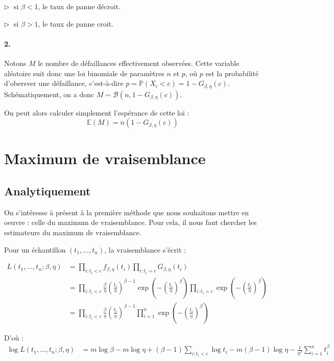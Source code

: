 \documentclass[a4paper]{report}
\begin{document}
 $\triangleright \; $ si $\beta<1$, le taux de panne décroit.
 
  $\triangleright \; $ si $\beta>1$, le taux de panne croit.
  
  \subsubsection{2.}
  Notons $M$ le nombre de défaillances effectivement observées. Cette variable aléatoire suit donc une loi binomiale de paramètres $n$ et $p$, où $p$ est la probabilité d'obersver une défaillance, c'est-à-dire $p=\mathbb{P}(X_i<c)=1-G_{\beta,\eta}(c)$. Schématiquement, on a donc $M \sim \mathcal{B}(n,1-G_{\beta,\eta}(c))$.
  
  On peut alors calculer simplement l'espérance de cette loi :
  \[\mathbb{E}(M)=n(1-G_{\beta,\eta}(c))\]
  
  
  \chapter {Maximum de vraisemblance}
  
    \section{Analytiquement \label{sec:calculEMV}}
    
    On s'intéresse à présent à la première méthode que nous souhaitons mettre en oeuvre : celle du maximum de vraisemblance. Pour cela, il nous faut chercher les estimateurs du maximum de vraisemblance.
    
    Pour un échantillon $(t_1,...,t_n)$, la vraisemblance s'écrit :
    
    \begin{align*}
	L(t_1,...,t_n;\beta,\eta) & = \prod_{i:t_i<c} {f_{\beta,\eta}(t_i)}  \prod_{i:t_i=c} {G_{\beta,\eta}(t_i)} \\
	& =  \prod_{i:t_i<c}{\frac{\beta}{\eta} \left(\frac{t_i}{\eta}\right)^{\beta-1}\exp\left(-\left(\frac{t_i}{\eta}\right)^{\beta}\right) }  \prod_{i:t_i=c} {\exp\left(-\left(\frac{t_i}{\eta}\right)^{\beta}\right)}\\
	& = \prod_{i:t_i<c}{\frac{\beta}{\eta} \left(\frac{t_i}{\eta}\right)^{\beta-1} }  \prod_{i=1}^{n} {\exp\left(-\left(\frac{t_i}{\eta}\right)^{\beta}\right)}
	\end{align*}
	
	D'où :
	\begin{align*}
	\log L(t_1,...,t_n;\beta,\eta) & = m \log \beta - m\log \eta + (\beta-1)\sum_{i:t_i<c}{\log t_i} - m(\beta-1)\log \eta - \frac{1}{\eta^\beta} \sum_{i=1}^{n} {t_i^\beta}
     \end{align*}
     
\end{document}
